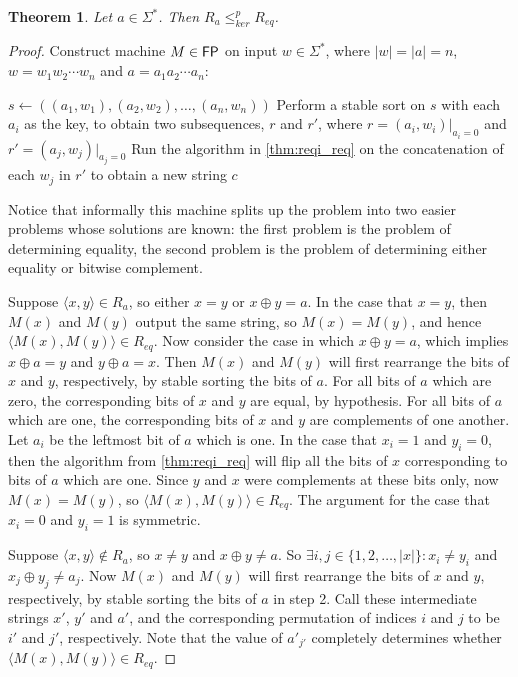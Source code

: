 \documentclass{article}
\newtheorem{theorem}{Theorem}[section]
\theoremstyle{definition} \newtheorem{definition}[definition]{Definition}
\newcommand{\sigmastar}{\Sigma^{*}} %
\newcommand{\kr}{\leq^{p}_{ker}} %
\newcommand{\pair}[2]{\langle#1,#2\rangle} %
\begin{document}
\begin{theorem}Let $a\in\sigmastar$. Then $R_a\kr R_{eq}$.\end{theorem}
\begin{proof}
  Construct machine $M\in{\ensuremath{\mathsf{FP}}}$ on input $w\in\sigmastar$, where $|w|=|a|=n$,
  $w=w_1w_2\cdots w_n$ and $a=a_1a_2\cdots a_n$:\\
  \begin{algorithm}[H]
    $s\gets((a_1, w_1), (a_2, w_2), \ldots, (a_n, w_n))$\;
    Perform a stable sort on $s$ with each $a_i$ as the key, to obtain two
    subsequences, $r$ and $r'$, where $r=(a_i, w_i)|_{a_i=0}$ and $r'=(a_j,
    w_j)|_{a_j=0}$\;
    Run the algorithm in \autoref{thm:reqi_req} on the concatenation of each
    $w_j$ in $r'$ to obtain a new string $c$\;
  \end{algorithm}
  Notice that informally this machine splits up the problem into two easier
  problems whose solutions are known: the first problem is the problem of
  determining equality, the second problem is the problem of determining either
  equality or bitwise complement.

  Suppose $\pair{x}{y}\in R_a$, so either $x=y$ or $x\oplus y=a$. In the case
  that $x=y$, then $M(x)$ and $M(y)$ output the same string, so $M(x)=M(y)$,
  and hence $\pair{M(x)}{M(y)}\in R_{eq}$. Now consider the case in which
  $x\oplus y=a$, which implies $x\oplus a=y$ and $y\oplus a=x$. Then $M(x)$ and
  $M(y)$ will first rearrange the bits of $x$ and $y$, respectively, by stable
  sorting the bits of $a$. For all bits of $a$ which are zero, the
  corresponding bits of $x$ and $y$ are equal, by hypothesis. For all bits of
  $a$ which are one, the corresponding bits of $x$ and $y$ are complements of
  one another. Let $a_i$ be the leftmost bit of $a$ which is one. In the case
  that $x_i=1$ and $y_i=0$, then the algorithm from \autoref{thm:reqi_req} will
  flip all the bits of $x$ corresponding to bits of $a$ which are one. Since
  $y$ and $x$ were complements at these bits only, now $M(x)=M(y)$, so
  $\pair{M(x)}{M(y)}\in R_{eq}$. The argument for the case that $x_i=0$ and
  $y_i=1$ is symmetric.

  Suppose $\pair{x}{y}\notin R_a$, so $x\neq y$ and $x\oplus y\neq a$. So
  $\exists i,j\in\{1,2,\ldots,|x|\}: x_i\neq y_i$ and $x_j\oplus y_j\neq
  a_j$. Now $M(x)$ and $M(y)$ will first rearrange the bits of $x$ and $y$,
  respectively, by stable sorting the bits of $a$ in step 2. Call these
  intermediate strings $x'$, $y'$ and $a'$, and the corresponding permutation
  of indices $i$ and $j$ to be $i'$ and $j'$, respectively. Note that the value
  of $a'_{j'}$ completely determines whether $\pair{M(x)}{M(y)}\in R_{eq}$.


\end{proof}
\end{document}
